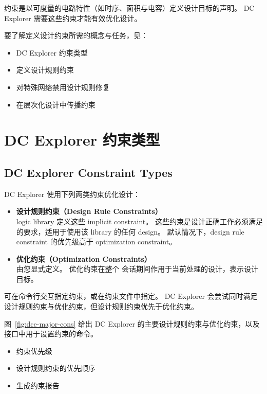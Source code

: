 \label{chap:constraints}

约束是以可度量的电路特性（如时序、面积与电容）定义设计目标的声明。
DC Explorer 需要这些约束才能有效优化设计。

要了解定义设计约束所需的概念与任务，见：
\begin{itemize}
  \item DC Explorer 约束类型
  \item 定义设计规则约束
  \item 对特殊网络禁用设计规则修复
  \item 在层次化设计中传播约束
\end{itemize}

\section{DC Explorer 约束类型}
\subsection*{DC Explorer Constraint Types}

DC Explorer 使用下列两类约束优化设计：
\begin{itemize}
  \item \textbf{设计规则约束（Design Rule Constraints）}\\
logic library 定义这些 implicit constraint。
这些约束是设计正确工作必须满足的要求，适用于使用该 library 的任何 design。
默认情况下，design rule constraint 的优先级高于 optimization constraint。
  \item \textbf{优化约束（Optimization Constraints）}\\
        由您显式定义。
        优化约束在整个  会话期间作用于当前处理的设计，表示设计目标。
\end{itemize}

可在命令行交互指定约束，或在约束文件中指定。
DC Explorer 会尝试同时满足设计规则约束与优化约束，但设计规则约束优先于优化约束。

图~\ref{fig:dce-major-cons} 给出 DC Explorer 的主要设计规则约束与优化约束，以及  接口中用于设置约束的命令。


\begin{seeAlsoBox}
\begin{itemize}
  \item 约束优先级
  \item 设计规则约束的优先顺序
  \item 生成约束报告
\end{itemize}
\end{seeAlsoBox}

